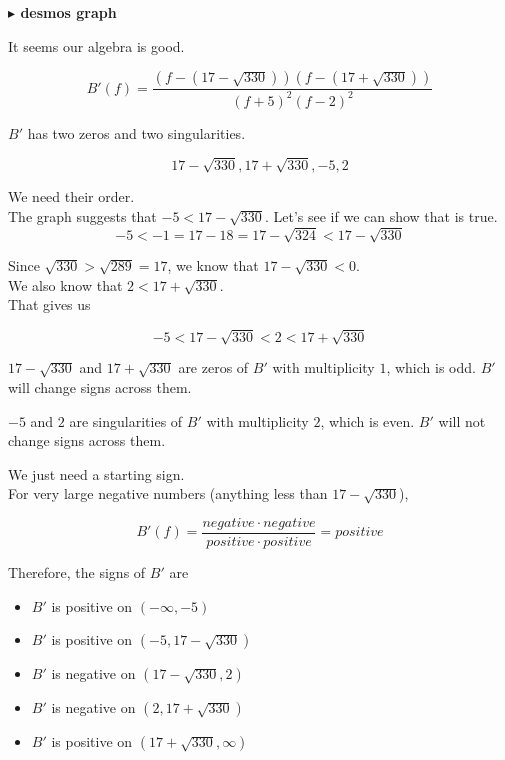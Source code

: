 \documentclass{ximera}
\begin{document}
\begin{example}
\textbf{\textcolor{blue!55!black}{$\blacktriangleright$ desmos graph}} 
\begin{center}
\end{center}




It seems our algebra is good.



\[
B'(f) = \frac{(f - (17 - \sqrt{330}))(f - (17 + \sqrt{330}))}{(f+5)^2(f-2)^2}
\]


$B'$ has two zeros and two singularities.

\[
17 - \sqrt{330}, 17 + \sqrt{330}, -5, 2
\]

We need their order. \\




The graph suggests that $-5 < 17 - \sqrt{330}$.  Let's see if we can show that is true. \\



\[
-5 < -1 = 17 - 18 = 17 -\sqrt{324} < 17 - \sqrt{330}
\]


Since $ \sqrt{330} > \sqrt{289} = 17$, we know that $17 - \sqrt{330} < 0$. \\


We also know that $2 < 17 + \sqrt{330} $. \\


That gives us

\[
-5 < 17 - \sqrt{330} < 2 < 17 + \sqrt{330}
\]


$17 - \sqrt{330}$ and $17 + \sqrt{330}$ are zeros of $B'$ with multiplicity $1$, which is odd.  $B'$ will change signs across them.



$-5$ and $2$ are singularities of $B'$ with multiplicity $2$, which is even.  $B'$ will not change signs across them.


We just need a starting sign. \\



For very large negative numbers (anything less than $17 - \sqrt{330}$), 

\[
B'(f) = \frac{negative \cdot negative}{positive \cdot positive} = positive
\]


Therefore, the signs of $B'$ are


\begin{itemize}
  \item $B'$ is positive on $(-\infty, -5)$
  \item $B'$ is positive on $(-5, 17 - \sqrt{330})$
  \item $B'$ is negative on $(17 - \sqrt{330}, 2)$
  \item $B'$ is negative on $(2, 17 + \sqrt{330})$
  \item $B'$ is positive on $(17 + \sqrt{330}, \infty)$
\end{itemize}




\end{example}
\end{document}
